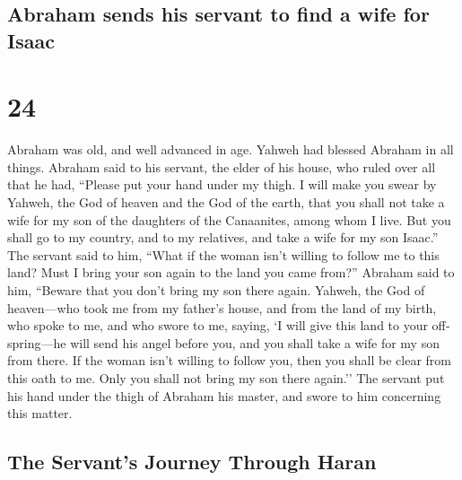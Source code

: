 \begin{paracol}{2}
\switchcolumn
\begin{otherlanguage}{english}

\hypertarget{abraham-sends-his-servant-to-find-a-wife-for-isaac}{%
\subsection{Abraham sends his servant to find a wife for
Isaac}\label{abraham-sends-his-servant-to-find-a-wife-for-isaac}}

\hypertarget{section-47}{%
\section{24}\label{section-47}}

 Abraham was old, and well advanced in age. Yahweh had
blessed Abraham in all things.  Abraham said to his
servant, the elder of his house, who ruled over all that he had,
``Please put your hand under my thigh.  I will make you
swear by Yahweh, the God of heaven and the God of the earth, that you
shall not take a wife for my son of the daughters of the Canaanites,
among whom I live.  But you shall go to my country, and to
my relatives, and take a wife for my son Isaac.''  The
servant said to him, ``What if the woman isn't willing to follow me to
this land? Must I bring your son again to the land you came from?''
 Abraham said to him, ``Beware that you don't bring my son
there again.  Yahweh, the God of heaven---who took me from
my father's house, and from the land of my birth, who spoke to me, and
who swore to me, saying, `I will give this land to your offspring---he
will send his angel before you, and you shall take a wife for my son
from there.  If the woman isn't willing to follow you,
then you shall be clear from this oath to me. Only you shall not bring
my son there again.''  The servant put his hand under the
thigh of Abraham his master, and swore to him concerning this matter.

\hypertarget{the-servants-journey-through-haran}{%
\subsection{The Servant's Journey Through
Haran}\label{the-servants-journey-through-haran}}


\end{otherlanguage}
\end{paracol}
